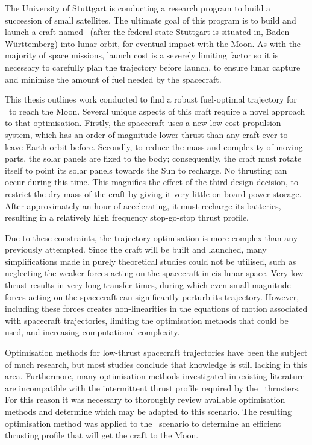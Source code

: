 
\vfill

The University of Stuttgart is conducting a research program to build a succession of small satellites. The ultimate goal of this program is to build and launch a craft named \BW\ (after the federal state Stuttgart is situated in, Baden-W\"{u}rttemberg) into lunar orbit, for eventual impact with the Moon. As with the majority of space missions, launch cost is a severely limiting factor so it is necessary to carefully plan the trajectory before launch, to ensure lunar capture and minimise the amount of fuel needed by the spacecraft.

This thesis outlines work conducted to find a robust fuel-optimal trajectory for \BW\ to reach the Moon. Several unique aspects of this craft require a novel approach to that optimisation. Firstly, the spacecraft uses a new low-cost propulsion system, which has an order of magnitude lower thrust than any craft ever to leave Earth orbit before. Secondly, to reduce the mass and complexity of moving parts, the solar panels are fixed to the body; consequently, the craft must rotate itself to point its solar panels towards the Sun to recharge. No thrusting can occur during this time. This magnifies the effect of the third design decision, to restrict the dry mass of the craft by giving it very little on-board power storage. After approximately an hour of accelerating, it must recharge its batteries, resulting in a relatively high frequency stop-go-stop thrust profile.

Due to these constraints, the trajectory optimisation is more complex than any previously attempted. Since the craft will be built and launched, many simplifications made in purely theoretical studies could not be utilised, such as neglecting the weaker forces acting on the spacecraft in cis-lunar space. Very low thrust results in very long transfer times, during which even small magnitude forces acting on the spacecraft can significantly perturb its trajectory. However, including these forces creates non-linearities in the equations of motion associated with spacecraft trajectories, limiting the optimisation methods that could be used, and increasing computational complexity.

Optimisation methods for low-thrust spacecraft trajectories have been the subject of much research, but most studies conclude that knowledge is still lacking in this area. Furthermore, many optimisation methods investigated in existing literature are incompatible with the intermittent thrust profile required by the \BW\ thrusters. For this reason it was necessary to thoroughly review available optimisation methods and determine which may be adapted to this scenario. The resulting optimisation method was applied to the \BW\ scenario to determine an efficient thrusting profile that will get the craft to the Moon.

